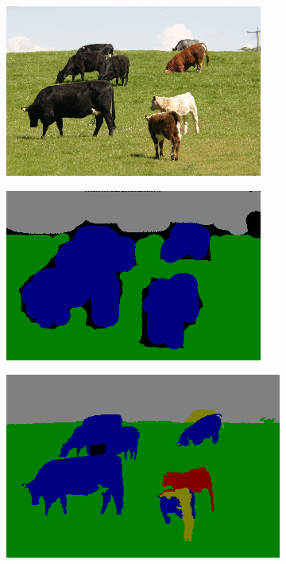 \documentclass{article} %
\begin{document}
\begin{figure}[htb]
\centering
	\begin{subfigure}[t]{0.19\textwidth}
		\centering
		\includegraphics[width = \textwidth]{./img/1_11_s.png}
		\caption{}
		\label{fig:orig_good}
			\end{subfigure}
	\begin{subfigure}[t]{0.19\textwidth}
		\centering
		\includegraphics[width = \textwidth]{./img/1_11_s_GT.png}
		\caption{}
		\label{fig:GT_good}
	\end{subfigure}
	\begin{subfigure}[t]{0.19\textwidth}
		\centering
		\includegraphics[width = \textwidth]{./img/1_11_s_prior.png}

\end{subfigure}
\end{figure}
\end{document}

